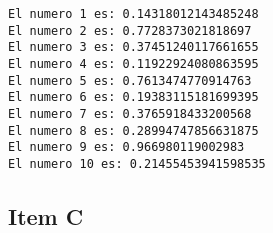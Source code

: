 \documentclass[11pt]{article}
\begin{document}
    \begin{Verbatim}[commandchars=\\\{\}]
El numero 1 es: 0.14318012143485248
El numero 2 es: 0.7728373021818697
El numero 3 es: 0.37451240117661655
El numero 4 es: 0.11922924080863595
El numero 5 es: 0.7613474770914763
El numero 6 es: 0.19383115181699395
El numero 7 es: 0.3765918433200568
El numero 8 es: 0.28994747856631875
El numero 9 es: 0.966980119002983
El numero 10 es: 0.21455453941598535

    \end{Verbatim}

    \hypertarget{item-c}{%
\subsection{Item C}\label{item-c}}
\end{document}
